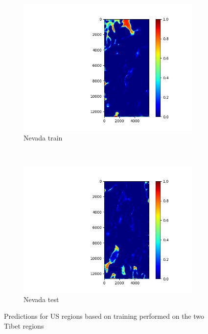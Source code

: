 \documentclass[11pt,a4paper]{article}
\begin{document}
\begin{figure}[t]
    \centering
    \begin{subfigure}[b]{0.75\textwidth}
        \includegraphics[width=\textwidth]{graphics/training/train_on_01_features_01234/heatmaps_faults_6.png}
        \caption{Nevada train}
    \end{subfigure}
    ~
    \begin{subfigure}[b]{0.75\textwidth}
        \includegraphics[width=\textwidth]{graphics/training/train_on_01_features_01234/heatmaps_faults_7.png}
        \caption{Nevada test}
    \end{subfigure}
    \caption{Predictions for US regions based on training performed on the two Tibet regions}
    \label{fig:train_on_01_features_01234_no_additional_im_us}
\end{figure}
\end{document}
